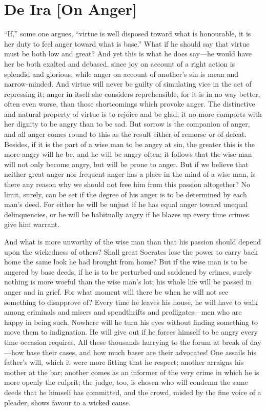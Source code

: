 
\author{Seneca}
\chapter[De Ira {[On Anger]}, bk. 2.6--2.10]{De Ira [On Anger]}

``If,'' some one argues, ``virtue is well disposed toward
what is honourable, it is her duty to feel anger toward what is
base.'' What if he should say that virtue must be both low and great?
And yet this is what he does say---he would have her be both exalted
and debased, since joy on account of a right action is splendid and
glorious, while anger on account of another's sin is mean and
narrow-minded.  And virtue will never be guilty of
simulating vice in the act of repressing it; anger in itself she
considers reprehensible, for it is in no way better, often even worse,
than those shortcomings which provoke anger. The distinctive and
natural property of virtue is to rejoice and be glad; it no more
comports with her dignity to be angry than to be sad. But sorrow is
the companion of anger, and all anger comes round to this as the
result either of remorse or of defeat. Besides, if it is the part of a
wise man to be angry at sin, the greater this is the more angry will
he be, and he will be angry often; it follows that the wise man will
not only become angry, but will be prone to anger. But if we believe
that neither great anger nor frequent anger has a place in the mind of
a wise man, is there any reason why we should not free him from this
passion altogether? No limit, surely, can be set if the degree of his
anger is to be determined by each man's deed. For either he will be
unjust if he has equal anger toward unequal delinquencies, or he will
be habitually angry if he blazes up every time crimes give him
warrant.

And what is more unworthy of the wise man than that his passion should
depend upon the wickedness of others? Shall great Socrates lose the
power to carry back home the same look he had brought from home? But
if the wise man is to be angered by base deeds, if he is to be
perturbed and saddened by crimes, surely nothing is more woeful than
the wise man's lot; his whole life will be passed in anger and in
grief. For what moment will there be when he will not see something to
disapprove of? Every time he leaves his house, he will have to walk
among criminals and misers and spendthrifts and 
prof\-li\-gates---men who are happy in being such. Nowhere will he
turn his eyes without finding something to move them to indignation.
He will give out if he forces himself to be angry every time occasion
requires. All these thousands hurrying to the forum at break of
day---how base their cases, and how much baser are their advocates!
One assails his father's will, which it were more fitting that he
respect; another arraigns his mother at the bar; another comes as an
informer of the very crime in which he is more openly the culprit; the
judge, too, is chosen who will condemn the same deeds that he himself
has committed, and the crowd, misled by the fine voice of a pleader,
shows favour to a wicked cause.

